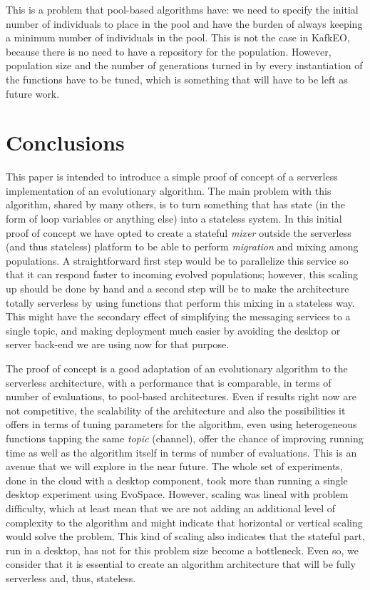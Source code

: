 \documentclass{llncs}
\begin{document}
  This is a problem that pool-based algorithms have: we need to
  specify the initial number of individuals to place in the pool and have the
  burden of always keeping a minimum number of individuals in the pool. This
  is not the case in KafkEO, because there is no need to have a
  repository for the population. However, population size and the number
  of generations turned in by every instantiation of the functions have
  to be tuned, which is something that will have to be left as future
  work.


  \section{Conclusions}
  \label{sec:con}

  This paper is intended to introduce a simple proof of concept of a
  serverless implementation of an evolutionary algorithm. The main
  problem with this algorithm, shared by many others, is to turn
  something that has state (in the form of loop variables or anything
  else) into a stateless system. In this initial proof of concept we have
  opted to create a stateful {\em mixer} outside the serverless (and
  thus stateless) platform to be able to perform {\em
    migration} and mixing among populations. A straightforward first step
  would be to parallelize this service so that it can respond faster to
  incoming evolved populations; however, this scaling up should be done
  by hand and a second step will be to make the architecture totally
  serverless by using functions that perform this mixing in a stateless
  way. This might have the secondary effect of simplifying the messaging
  services to a single topic, and making deployment much easier by
  avoiding the desktop or server back-end we are using now for that
  purpose.

  The proof of concept is a good adaptation of an evolutionary algorithm
  to the serverless architecture, with a performance that is comparable,
  in terms of number of evaluations, to pool-based architectures. Even
  if results right now are not competitive, the scalability of the
  architecture and also the possibilities it offers in terms of tuning
  parameters for the algorithm, even using heterogeneous functions
  tapping the same {\em topic} (channel), offer the chance of improving
  running time as well as the algorithm itself in terms of number of
  evaluations. This is an avenue that we will explore in the near
  future. The whole set of experiments, done in the cloud with a desktop
  component, took more than running a single desktop experiment using
  EvoSpace. However, scaling was lineal with problem difficulty, which
  at least mean that we are not adding an additional level of complexity
  to the algorithm and might indicate that horizontal or vertical
  scaling would solve the problem. This kind of scaling also indicates
  that the stateful part, run in a desktop, has not for this problem
  size become a bottleneck. Even so, we consider that it is essential to
  create an algorithm architecture that will be fully serverless and,
  thus, stateless.
\end{document}

